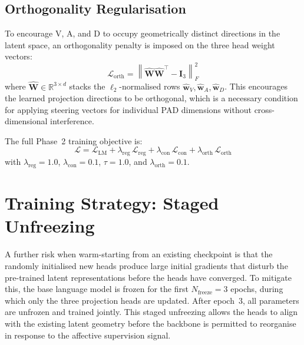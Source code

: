 \subsection{Orthogonality Regularisation}

To encourage V, A, and D to occupy geometrically distinct directions in the latent space, an orthogonality penalty is imposed on the three head weight vectors:
\[
    \mathcal{L}_{\text{orth}} = \left\| \hat{\mathbf{W}}\hat{\mathbf{W}}^\top - \mathbf{I}_3 \right\|_F^2
\]
where $\hat{\mathbf{W}} \in \mathbb{R}^{3 \times d}$ stacks the $\ell_2$-normalised rows $\hat{\mathbf{w}}_V, \hat{\mathbf{w}}_A, \hat{\mathbf{w}}_D$.
This encourages the learned projection directions to be orthogonal, which is a necessary condition for applying steering vectors for individual PAD dimensions without cross-dimensional interference.

The full Phase~2 training objective is:
\[
    \mathcal{L} = \mathcal{L}_{\text{LM}}
    + \lambda_{\text{reg}}\,\mathcal{L}_{\text{reg}}
    + \lambda_{\text{con}}\,\mathcal{L}_{\text{con}}
    + \lambda_{\text{orth}}\,\mathcal{L}_{\text{orth}}
\]
with $\lambda_{\text{reg}} = 1.0$, $\lambda_{\text{con}} = 0.1$, $\tau = 1.0$, and $\lambda_{\text{orth}} = 0.1$.

\section{Training Strategy: Staged Unfreezing}

A further risk when warm-starting from an existing checkpoint is that the randomly initialised new heads produce large initial gradients that disturb the pre-trained latent representations before the heads have converged.
To mitigate this, the base language model is frozen for the first $N_{\text{freeze}} = 3$ epochs, during which only the three projection heads are updated.
After epoch~3, all parameters are unfrozen and trained jointly.
This staged unfreezing allows the heads to align with the existing latent geometry before the backbone is permitted to reorganise in response to the affective supervision signal.


